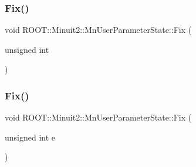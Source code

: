 \subsubsection{\texorpdfstring{Fix()}{Fix()}\hspace{0.1cm}{\footnotesize\ttfamily [1/4]}}
{\footnotesize\ttfamily void R\+O\+O\+T\+::\+Minuit2\+::\+Mn\+User\+Parameter\+State\+::\+Fix (\begin{DoxyParamCaption}\item[{unsigned int}]{ }\end{DoxyParamCaption})}

\mbox{\label{classROOT_1_1Minuit2_1_1MnUserParameterState_a89b898660495dd7fb95bb1c398941e17}} 
\subsubsection{\texorpdfstring{Fix()}{Fix()}\hspace{0.1cm}{\footnotesize\ttfamily [2/4]}}
{\footnotesize\ttfamily void R\+O\+O\+T\+::\+Minuit2\+::\+Mn\+User\+Parameter\+State\+::\+Fix (\begin{DoxyParamCaption}\item[{unsigned int}]{e }\end{DoxyParamCaption})}

